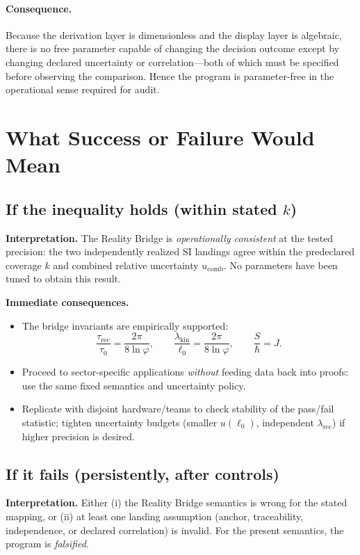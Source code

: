 \documentclass[11pt]{article}
\theoremstyle{plain}
\theoremstyle{definition}
\theoremstyle{remark}
\begin{document}
\paragraph{Consequence.}
Because the derivation layer is dimensionless and the display layer is algebraic, there is no free parameter capable of changing the decision outcome except by changing declared uncertainty or correlation—both of which must be specified before observing the comparison. Hence the program is parameter-free in the operational sense required for audit.

\section{What Success or Failure Would Mean}

\subsection*{If the inequality holds (within stated \(k\))}
\textbf{Interpretation.} The Reality Bridge is \emph{operationally consistent} at the tested precision: the two independently realized SI landings agree within the predeclared coverage \(k\) and combined relative uncertainty \(u_{\mathrm{comb}}\). No parameters have been tuned to obtain this result.

\textbf{Immediate consequences.}
\begin{itemize}
  \item The bridge invariants are empirically supported:
  \[
  \frac{\tau_{\mathrm{rec}}}{\tau_{0}}=\frac{2\pi}{8\ln\varphi},\qquad
  \frac{\lambda_{\mathrm{kin}}}{\ell_{0}}=\frac{2\pi}{8\ln\varphi},\qquad
  \frac{S}{\hbar}=J.
  \]
  \item Proceed to sector-specific applications \emph{without} feeding data back into proofs: use the same fixed semantics and uncertainty policy.
  \item Replicate with disjoint hardware/teams to check stability of the pass/fail statistic; tighten uncertainty budgets (smaller \(u(\ell_{0})\), independent \(\lambda_{\mathrm{rec}}\)) if higher precision is desired.
\end{itemize}

\subsection*{If it fails (persistently, after controls)}
\textbf{Interpretation.} Either (i) the Reality Bridge semantics is wrong for the stated mapping, or (ii) at least one landing assumption (anchor, traceability, independence, or declared correlation) is invalid. For the present semantics, the program is \emph{falsified}.
\end{document}
